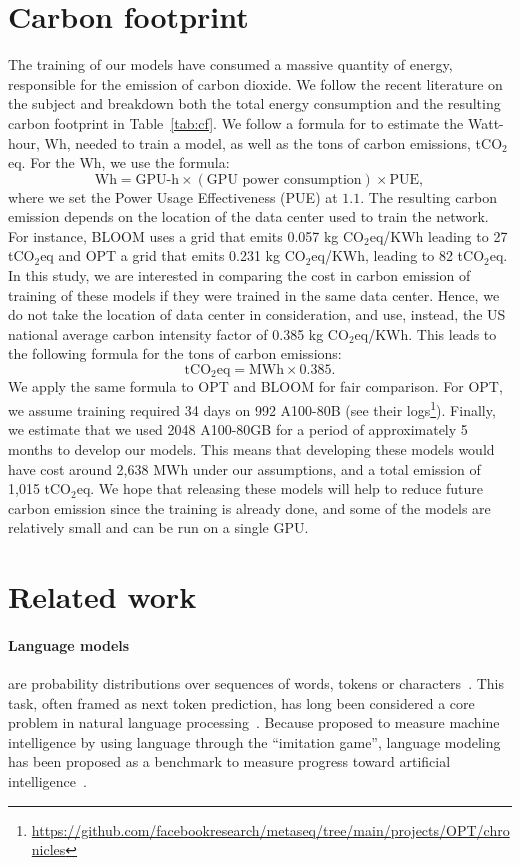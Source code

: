 \documentclass[11pt]{article}
\begin{document}
\section{Carbon footprint}

The training of our models have consumed a massive quantity of energy, responsible for the emission of carbon dioxide. 
We follow the recent literature on the subject and breakdown both the total energy consumption and the resulting carbon footprint in Table~\ref{tab:cf}.
We follow a formula for \citet{wu2022sustainable} to estimate the Watt-hour, Wh,  needed to train a model, as well as the tons of carbon emissions, tCO$_2$eq.
For the Wh, we use the formula:
$$\textrm{Wh} = \textrm{GPU-h}\times(\textrm{GPU power consumption}) \times \textrm{PUE},$$ where we set the Power Usage Effectiveness (PUE) at $1.1$.
The resulting carbon emission depends on the location of the data center used to train the network. For instance, BLOOM uses a grid that emits 0.057 kg CO$_2$eq/KWh leading to 27 tCO$_2$eq and OPT a grid that emits 0.231 kg CO$_2$eq/KWh, leading to 82 tCO$_2$eq.
In this study, we are interested in comparing the cost in carbon emission of training of these models if they were trained in the same data center.
Hence, we do not take the location of data center in consideration, and use, instead, the US national average carbon intensity factor of 0.385 kg CO$_2$eq/KWh.
This leads to the following formula for the tons of carbon emissions:
$$\textrm{tCO}_2\textrm{eq}=\textrm{MWh}\times0.385.$$
We apply the same formula to OPT and BLOOM for fair comparison.
For OPT, we assume training required 34 days on 992 A100-80B (see their logs\footnote{\url{https://github.com/facebookresearch/metaseq/tree/main/projects/OPT/chronicles}}).
Finally, we estimate that we used 2048 A100-80GB for a period of approximately 5 months to develop our models.
This means that developing these models would have cost around 2,638 MWh under our assumptions, and a total emission of 1,015 tCO$_2$eq.
We hope that releasing these models will help to reduce future carbon emission since the training is already done, and some of the models are relatively small and can be run on a single GPU.



\section{Related work}
\paragraph{Language models} are probability distributions over sequences of words, tokens or characters~\citep{shannon1948mathematical,shannon1951prediction}.
This task, often framed as next token prediction, has long been considered a core problem in natural language processing~\citep{bahl1983maximum,brown1990statistical}.
Because \citet{turing1950computing} proposed to measure machine intelligence by using language through the ``imitation game'', language modeling has been proposed as a benchmark to measure progress toward artificial intelligence~\citep{mahoney1999text}.
\end{document}
